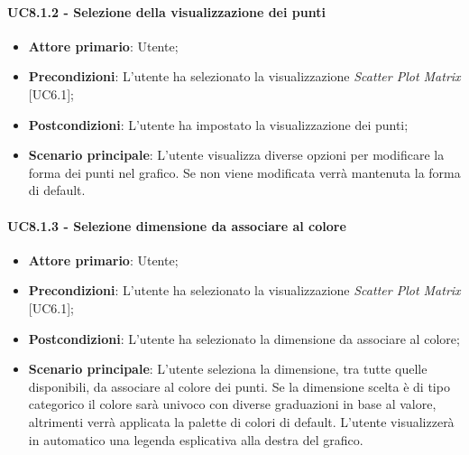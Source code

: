 \paragraph{UC8.1.2 - Selezione della visualizzazione dei punti}
\begin{itemize}
	\item \textbf{Attore primario}: Utente;
	\item \textbf{Precondizioni}: L'utente ha selezionato la visualizzazione \textit{Scatter Plot Matrix} [UC6.1];
	\item \textbf{Postcondizioni}: L'utente ha impostato la visualizzazione dei punti;		
	\item \textbf{Scenario principale}: L'utente visualizza diverse opzioni per modificare la forma dei punti nel grafico. Se non viene modificata verrà mantenuta la forma di default.
\end{itemize}

\paragraph{UC8.1.3 - Selezione dimensione da associare al colore}
\begin{itemize}
	\item \textbf{Attore primario}: Utente;
	\item \textbf{Precondizioni}: L'utente ha selezionato la visualizzazione \textit{Scatter Plot Matrix} [UC6.1];
	\item \textbf{Postcondizioni}: L'utente ha selezionato la dimensione da associare al colore;
	
	\item \textbf{Scenario principale}: L'utente seleziona la dimensione, tra tutte quelle disponibili, da associare al colore dei punti. Se la dimensione scelta è di tipo categorico il colore sarà univoco con diverse graduazioni in base al valore, altrimenti verrà applicata la palette di colori di default. L'utente visualizzerà in automatico una legenda esplicativa alla destra del grafico.
\end{itemize}